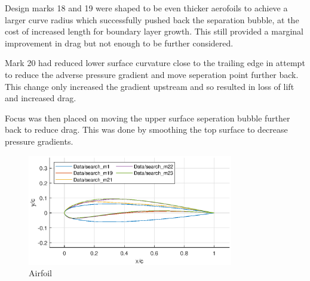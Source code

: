 \documentclass{article}
\begin{document}
Design marks 18 and 19 were shaped to be even thicker aerofoils to achieve a larger curve radius which successfully pushed back the separation bubble, at the cost of increased length for boundary layer growth.
This still provided a marginal improvement in drag but not enough to be further considered.

Mark 20 had reduced lower surface curvature close to the trailing edge in attempt to reduce the adverse pressure gradient and move seperation point further back.
This change only increased the gradient upstream and so resulted in loss of lift and increased drag.

Focus was then placed on moving the upper surface seperation bubble further back to reduce drag.
This was done by smoothing the top surface to decrease pressure gradients.


\begin{figure}[H]
    \centering
    \includegraphics[width=0.8\textwidth]{figures/loRe_geometry_23.eps}
    \caption{Airfoil}
    \label{fig:m23_geometry}
\end{figure}
\end{document}
